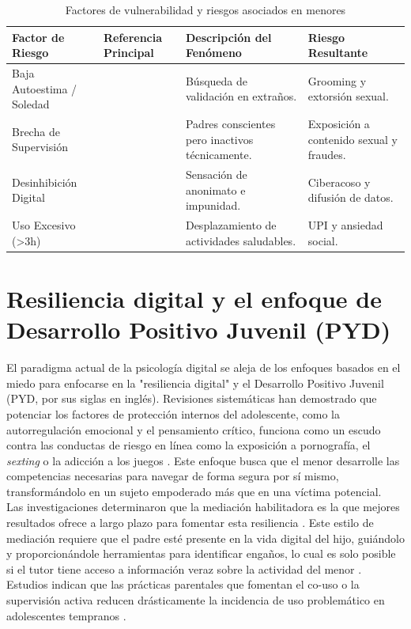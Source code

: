 \begin{table}[h!]
\centering
\caption{Factores de vulnerabilidad y riesgos asociados en menores}
\begin{tabular}{|p{3.5cm}|p{4cm}|p{4cm}|p{3cm}|}
\hline
\textbf{Factor de Riesgo} & \textbf{Referencia Principal} & \textbf{Descripción del Fenómeno} & \textbf{Riesgo Resultante} \\ \hline
Baja Autoestima / Soledad & \cite{el-asam_psychological_2022, page_psychological_2025} & Búsqueda de validación en extraños. & Grooming y extorsión sexual. \\ \hline
Brecha de Supervisión & \cite{ayyash_cybersecurity_2024, rojas_technical_2025} & Padres conscientes pero inactivos técnicamente. & Exposición a contenido sexual y fraudes. \\ \hline
Desinhibición Digital & \cite{zhu_cyberbullying_2021, yusuf_lets_2023} & Sensación de anonimato e impunidad. & Ciberacoso y difusión de datos. \\ \hline
Uso Excesivo (>3h) & \cite{soriano-molina_association_2025, bohnert_emerging_2021} & Desplazamiento de actividades saludables. & UPI y ansiedad social. \\ \hline
\end{tabular}
\end{table}

\section{Resiliencia digital y el enfoque de Desarrollo Positivo Juvenil (PYD)}

El paradigma actual de la psicología digital se aleja de los enfoques basados en el miedo para enfocarse en la "resiliencia digital" y el Desarrollo Positivo Juvenil (PYD, por sus siglas en inglés). Revisiones sistemáticas han demostrado que potenciar los factores de protección internos del adolescente, como la autorregulación emocional y el pensamiento crítico, funciona como un escudo contra las conductas de riesgo en línea como la exposición a pornografía, el \textit{sexting} o la adicción a los juegos \cite{martin-barrado_association_2025}. Este enfoque busca que el menor desarrolle las competencias necesarias para navegar de forma segura por sí mismo, transformándolo en un sujeto empoderado más que en una víctima potencial.\\

Las investigaciones determinaron que la mediación habilitadora es la que mejores resultados ofrece a largo plazo para fomentar esta resiliencia \cite{livingstone_maximizing_2017, stoilova_parental_2024}. Este estilo de mediación requiere que el padre esté presente en la vida digital del hijo, guiándolo y proporcionándole herramientas para identificar engaños, lo cual es solo posible si el tutor tiene acceso a información veraz sobre la actividad del menor \cite{zgambo_effect_2025, allison_parental_2025}. Estudios indican que las prácticas parentales que fomentan el co-uso o la supervisión activa reducen drásticamente la incidencia de uso problemático en adolescentes tempranos \cite{nagata_associations_2025}.\\

